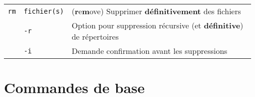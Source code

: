 \documentclass [a4paper]{article}
\begin{document}
\begin{tabular}{ lll }
{\verb+rm+}     & \verb+fichier(s)+                 & (\textbf{r}e\textbf{m}ove) Supprimer \textbf{définitivement} des fichiers \\
                & \hspace{-0.6cm}\verb+-r+                         & \hspace{0.4cm} Option pour suppression récursive (et \textbf{définitive}) de répertoires\\
                & \hspace{-0.6cm}\verb+-i+                         & \hspace{0.4cm} Demande confirmation avant les suppressions \\
\hline
\end{tabular}

\section*{Commandes de base}
\end{document}
